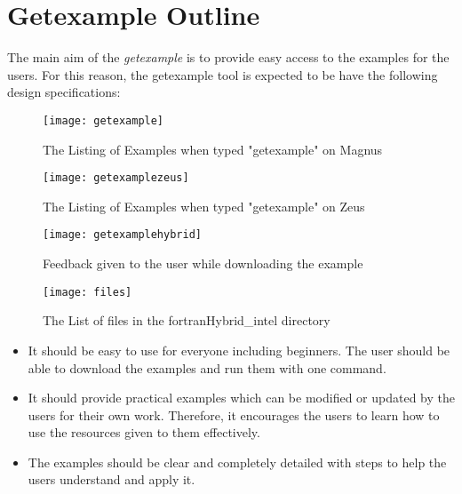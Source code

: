 
\section{Getexample Outline}

The main aim of the \emph{getexample} is to provide easy access to the examples for the users. For this reason, the getexample tool is expected to be 
have the following design specifications:

\begin{figure}[!ht]
\begin{center}
\texttt{[image: getexample]}
\caption{The Listing of Examples when typed "getexample" on Magnus}
\end{center}
\end{figure}

\begin{figure}[!ht]
\begin{center}
\texttt{[image: getexamplezeus]}
\caption{The Listing of Examples when typed "getexample" on Zeus}
\end{center}
\end{figure}

\begin{figure}[!ht]
\begin{center}
\texttt{[image: getexamplehybrid]}
\caption{Feedback given to the user while downloading the example}
\end{center}
\end{figure}

\begin{figure}[!ht]
\begin{center}
\texttt{[image: files]}
\caption{The List of files in the fortranHybrid\_intel directory}
\end{center}
\end{figure}

\clearpage

\begin{itemize}
\item It should be easy to use for everyone including beginners. The user should be able to download the examples and run them with one command.
\item It should provide practical examples which can be modified or updated by the users for their own work. Therefore, it encourages the users to learn
how to use the resources given to them effectively.
\item The examples should be clear and completely detailed with steps to help the users understand and apply it.
\end{itemize}

